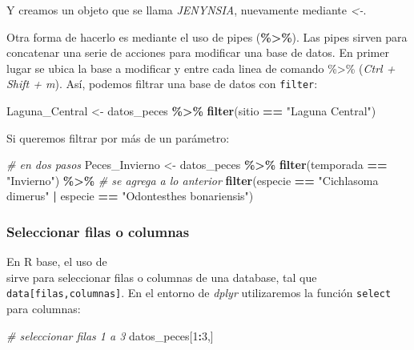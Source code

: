 \documentclass[
]{article}
\newenvironment{Shaded}{\begin{snugshade}}{\end{snugshade}}
\newcommand{\CommentTok}[1]{\textcolor[rgb]{0.56,0.35,0.01}{\textit{#1}}}
\newcommand{\DecValTok}[1]{\textcolor[rgb]{0.00,0.00,0.81}{#1}}
\newcommand{\FunctionTok}[1]{\textcolor[rgb]{0.13,0.29,0.53}{\textbf{#1}}}
\newcommand{\NormalTok}[1]{#1}
\newcommand{\OtherTok}[1]{\textcolor[rgb]{0.56,0.35,0.01}{#1}}
\newcommand{\SpecialCharTok}[1]{\textcolor[rgb]{0.81,0.36,0.00}{\textbf{#1}}}
\newcommand{\StringTok}[1]{\textcolor[rgb]{0.31,0.60,0.02}{#1}}
\begin{document}
Y creamos un objeto que se llama \emph{JENYNSIA}, nuevamente mediante
\emph{\textless-}.

Otra forma de hacerlo es mediante el uso de pipes
(\textbf{\%\textgreater\%}). Las pipes sirven para concatenar una serie
de acciones para modificar una base de datos. En primer lugar se ubica
la base a modificar y entre cada linea de comando \%\textgreater\%
(\emph{Ctrl + Shift + m}). Así, podemos filtrar una base de datos con
\texttt{filter}:

\begin{Shaded}
\begin{Highlighting}[]
\NormalTok{Laguna\_Central }\OtherTok{\textless{}{-}}\NormalTok{ datos\_peces }\SpecialCharTok{\%\textgreater{}\%} \FunctionTok{filter}\NormalTok{(sitio }\SpecialCharTok{==} \StringTok{"Laguna Central"}\NormalTok{)}
\end{Highlighting}
\end{Shaded}

Si queremos filtrar por más de un parámetro:

\begin{Shaded}
\begin{Highlighting}[]
\CommentTok{\# en dos pasos}
\NormalTok{Peces\_Invierno }\OtherTok{\textless{}{-}}\NormalTok{ datos\_peces }\SpecialCharTok{\%\textgreater{}\%} 
  \FunctionTok{filter}\NormalTok{(temporada }\SpecialCharTok{==} \StringTok{"Invierno"}\NormalTok{) }\SpecialCharTok{\%\textgreater{}\%} \CommentTok{\# se agrega a lo anterior}
  \FunctionTok{filter}\NormalTok{(especie }\SpecialCharTok{==} \StringTok{"Cichlasoma dimerus"} \SpecialCharTok{|}\NormalTok{ especie }\SpecialCharTok{==} \StringTok{"Odontesthes bonariensis"}\NormalTok{)}
\end{Highlighting}
\end{Shaded}

\subsubsection{Seleccionar filas o
columnas}\label{seleccionar-filas-o-columnas}

En R base, el uso de \[ \] sirve para seleccionar filas o columnas de
una database, tal que \texttt{data{[}filas,columnas{]}}. En el entorno
de \emph{dplyr} utilizaremos la función \texttt{select} para columnas:

\begin{Shaded}
\begin{Highlighting}[]
\CommentTok{\# seleccionar filas 1 a 3}
\NormalTok{datos\_peces[}\DecValTok{1}\SpecialCharTok{:}\DecValTok{3}\NormalTok{,]}
\end{Highlighting}
\end{Shaded}
\end{document}
